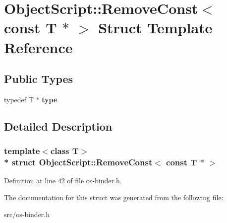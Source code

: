 \hypertarget{struct_object_script_1_1_remove_const_3_01const_01_t_01_5_01_4}{}\section{Object\+Script\+:\+:Remove\+Const$<$ const T $\ast$ $>$ Struct Template Reference}
\label{struct_object_script_1_1_remove_const_3_01const_01_t_01_5_01_4}
\subsection*{Public Types}
\begin{DoxyCompactItemize}
\item 
typedef T $\ast$ {\bfseries type}\hypertarget{struct_object_script_1_1_remove_const_3_01const_01_t_01_5_01_4_a7eeab3405c669d5a771a87d4d163f683}{}\label{struct_object_script_1_1_remove_const_3_01const_01_t_01_5_01_4_a7eeab3405c669d5a771a87d4d163f683}

\end{DoxyCompactItemize}


\subsection{Detailed Description}
\subsubsection*{template$<$class T$>$\\*
struct Object\+Script\+::\+Remove\+Const$<$ const T $\ast$ $>$}



Definition at line 42 of file os-\/binder.\+h.



The documentation for this struct was generated from the following file\+:\begin{DoxyCompactItemize}
\item 
src/os-\/binder.\+h\end{DoxyCompactItemize}
